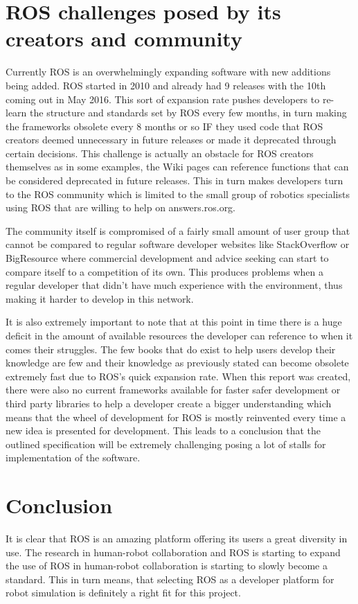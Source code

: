       \section{ROS challenges posed by its creators and community}
        Currently ROS is an overwhelmingly expanding software with new additions being added. ROS started in 2010 and already had 9 releases with the 10th coming out in May 2016. This sort of expansion rate pushes developers to re-learn the structure and standards set by ROS every few months, in turn making the frameworks obsolete every 8 months or so IF they used code that ROS creators deemed unnecessary in future releases or made it deprecated through certain decisions. This challenge is actually an obstacle for ROS creators themselves as in some examples, the Wiki pages can reference functions that can be considered deprecated in future releases. This in turn makes developers turn to the ROS community which is limited to the small group of robotics specialists using ROS that are willing to help on answers.ros.org.

        The community itself is compromised of a fairly small amount of user group that cannot be compared to regular software developer websites like StackOverflow or BigResource where commercial development and advice seeking can start to compare itself to a competition of its own. This produces problems when a regular developer that didn't have much experience with the environment, thus making it harder to develop in this network.

        It is also extremely important to note that at this point in time there is a huge deficit in the amount of available resources the developer can reference to when it comes their struggles. The few books that do exist to help users develop their knowledge are few and their knowledge as previously stated can become obsolete extremely fast due to ROS's quick expansion rate. When this report was created, there were also no current frameworks available for faster safer development or third party libraries to help a developer create a bigger understanding which means that the wheel of development for ROS is mostly reinvented every time a new idea is presented for development. This leads to a conclusion that the outlined specification will be extremely challenging posing a lot of stalls for implementation of the software.
        
    \section{Conclusion}
      It is clear that ROS is an amazing platform offering its users a great diversity in use. The research in human-robot collaboration and ROS is starting to expand the use of ROS in human-robot collaboration is starting to slowly become a standard. This in turn means, that selecting ROS as a developer platform for robot simulation is definitely a right fit for this project.

